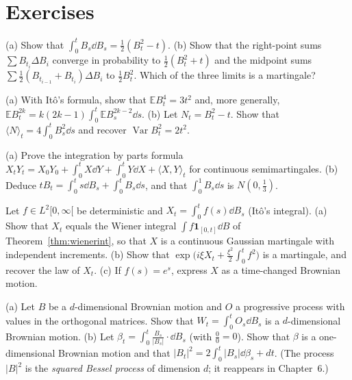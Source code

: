 \section{Exercises}

\begin{exercise}[$\star$]\label{ex:bdb}
(a) Show that $\int_0^tB_s\dd B_s=\frac12(B_t^2-t)$. (b) Show that the right-point sums $\sum B_{t_i}\Delta B_i$ converge in probability to $\frac12(B_t^2+t)$ and the midpoint sums $\sum\frac12(B_{t_{i-1}}+B_{t_i})\Delta B_i$ to
$\frac12B_t^2$. Which of the three limits is a martingale?
\end{exercise}

\begin{exercise}[$\star$]\label{ex:moments}
(a) With It\^o's formula, show that $\mathbb EB_t^4=3t^2$ and, more generally, $\mathbb EB_t^{2k}=k(2k-1)\int_0^t\mathbb EB_s^{2k-2}\dd s$. (b) Let $N_t=B_t^2-t$. Show that $\langle N\rangle_t=4\int_0^tB_s^2\dd s$ and recover $\operatorname{Var}B_t^2=2t^2$.
\end{exercise}

\begin{exercise}[$\star$]\label{ex:ibp}
(a) Prove the integration by parts formula $X_tY_t=X_0Y_0+\int_0^tX\dd Y+\int_0^tY\dd X+\langle X,Y\rangle_t$ for continuous semimartingales. (b) Deduce $tB_t=\int_0^ts\dd B_s+\int_0^tB_s\dd s$, and that
$\int_0^1B_s\dd s$ is $N(0,\frac13)$.
\end{exercise}

\begin{exercise}[$\star\star$]\label{ex:wienerito}
Let $f\in L^2[0,\infty[$ be deterministic and $X_t=\int_0^tf(s)\dd B_s$ (It\^o's integral). (a) Show that $X_t$ equals the Wiener integral $\int f\mathbf 1_{[0,t]}\dd B$ of Theorem~\ref{thm:wienerint}, so that $X$ is a continuous
Gaussian martingale with independent increments. (b) Show that $\exp\bigl(i\xi X_t+\frac{\xi^2}2\int_0^tf^2\bigr)$ is a martingale, and recover the law of $X_t$. (c) If $f(s)=e^{s}$, express $X$ as a time-changed Brownian motion.
\end{exercise}

\begin{exercise}[$\star\star$]\label{ex:rotation}
(a) Let $B$ be a $d$-dimensional Brownian motion and $O$ a progressive process with values in the orthogonal matrices. Show that $W_t=\int_0^tO_s\dd B_s$ is a $d$-dimensional Brownian motion. (b) Let
$\beta_t=\int_0^t\frac{B_s}{|B_s|}\cdot\dd B_s$ (with $\frac00=0$). Show that $\beta$ is a one-dimensional Brownian motion and that $|B_t|^2=2\int_0^t|B_s|\dd\beta_s+dt$. (The process $|B|^2$ is the
\emph{squared Bessel process} of dimension $d$; it reappears in Chapter~6.)
\end{exercise}

